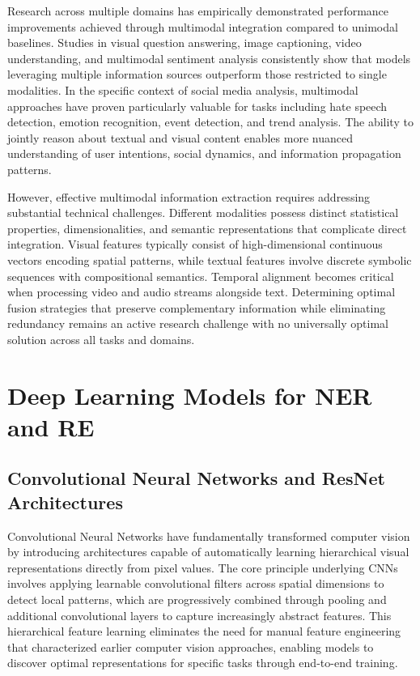 \documentclass[12pt,a4paper]{report}
\begin{document}
Research across multiple domains has empirically demonstrated performance improvements achieved through multimodal integration compared to unimodal baselines. Studies in visual question answering, image captioning, video understanding, and multimodal sentiment analysis consistently show that models leveraging multiple information sources outperform those restricted to single modalities. In the specific context of social media analysis, multimodal approaches have proven particularly valuable for tasks including hate speech detection, emotion recognition, event detection, and trend analysis. The ability to jointly reason about textual and visual content enables more nuanced understanding of user intentions, social dynamics, and information propagation patterns.

However, effective multimodal information extraction requires addressing substantial technical challenges. Different modalities possess distinct statistical properties, dimensionalities, and semantic representations that complicate direct integration. Visual features typically consist of high-dimensional continuous vectors encoding spatial patterns, while textual features involve discrete symbolic sequences with compositional semantics. Temporal alignment becomes critical when processing video and audio streams alongside text. Determining optimal fusion strategies that preserve complementary information while eliminating redundancy remains an active research challenge with no universally optimal solution across all tasks and domains.

\section{Deep Learning Models for NER and RE}

\subsection{Convolutional Neural Networks and ResNet Architectures}

Convolutional Neural Networks have fundamentally transformed computer vision by introducing architectures capable of automatically learning hierarchical visual representations directly from pixel values. The core principle underlying CNNs involves applying learnable convolutional filters across spatial dimensions to detect local patterns, which are progressively combined through pooling and additional convolutional layers to capture increasingly abstract features. This hierarchical feature learning eliminates the need for manual feature engineering that characterized earlier computer vision approaches, enabling models to discover optimal representations for specific tasks through end-to-end training.
\end{document}
